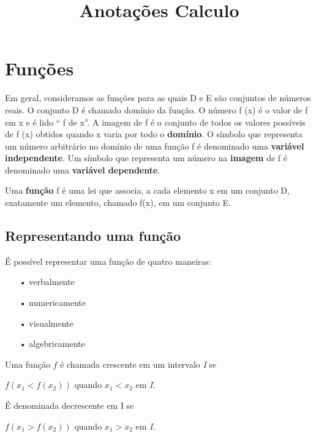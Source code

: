 \documentclass[10pt,a4paper]{article}
\title{Anotações Calculo}
\begin{document}
\maketitle
\tableofcontents
\newpage


\section{Funções}
Em geral, consideramos as funções para as quais D e E são conjuntos de números reais. O conjunto D é chamado domínio da função. O número f (x) é o valor de f em x e é lido “ f de x”. A imagem de f é o conjunto de todos os valores possíveis de f (x) obtidos quando x varia por todo o \textbf{domínio}. O símbolo que representa um número arbitrário no domínio de uma função f é denominado uma \textbf{variável independente}. Um símbolo que representa um número na \textbf{imagem} de f é denominado uma \textbf{variável dependente}.
\begin{df}
	Uma \textbf{função} f é uma lei que associa, a cada elemento x em um conjunto D, exatamente um elemento, chamado f(x), em um conjunto E.
\end{df}
\subsection*{Representando uma função}
\begin{multicols}{2}

\columnbreak
É possível representar uma função de quatro maneiras:
\begin{itemize}
	\item[•]verbalmente
	\item[•]numericamente
	\item[•]visualmente
	\item[•]algebricamente
\end{itemize}
\end{multicols}


\begin{df}
	Uma função $f$ é chamada crescente em um intervalo \textit{I} se
	
	\begin{center}
		$f(x_{1} < f(x_{2}))$ quando $x_{1} < x_{2}$ em \textit{I}.
	\end{center}

	É denominada decrescente em I se

	\begin{center}
		$f(x_{1} > f(x_{2}))$ quando $x_{1} > x_{2}$ em \textit{I}.
	\end{center}
\end{df}
\end{document}
